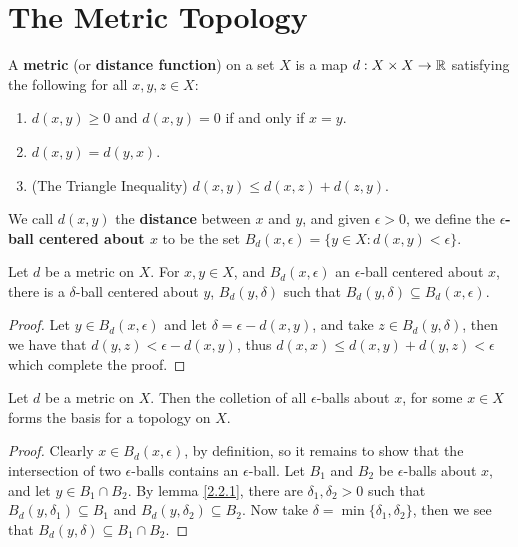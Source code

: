 
\section{The Metric Topology}

\begin{definition}
    A \textbf{metric} (or \textbf{distance function}) on a set $X$ is a map  $d:X \times X
    \rightarrow \mathbb{R}$ satisfying the following for all $x,y,z \in X$:
        \begin{enumerate}[label=(\arabic*)]
            \item $d(x,y) \geq 0$ and $d(x,y)=0$ if and only if $x=y$.

            \item $d(x,y)=d(y,x)$.

            \item (The Triangle Inequality) $d(x,y) \leq d(x,z)+d(z,y)$.
        \end{enumerate}
        We call $d(x,y)$ the \textbf{distance} between $x$ and  $y$, and given  $\epsilon>0$, we
    define the  \textbf{$\epsilon$-ball centered about $x$} to be the set $B_d(x,\epsilon)=\{y \in
    X: d(x,y)<\epsilon\}$.
\end{definition}

\begin{lemma}\label{2.2.1}
    Let $d$ be a metric on  $X$. For  $x,y \in X$, and  $B_d(x,\epsilon)$ an $\epsilon$-ball
    centered about  $x$, there is a  $\delta$-ball centered about  $y$,  $B_d(y,\delta)$ such that
    $B_d(y,\delta) \subseteq B_d(x,\epsilon)$.
\end{lemma}
\begin{proof}
    Let $y \in B_d(x,\epsilon)$ and let $\delta=\epsilon-d(x,y)$, and take $z \in B_d(y,\delta)$,
    then we have that $d(y,z)<\epsilon-d(x,y)$, thus $d(x,x) \leq d (x,y)+d(y,z)<\epsilon$ which
    complete the proof.
\end{proof}

\begin{theorem}\label{2.2.2}
    Let $d$ be a metric on  $X$. Then the colletion of all  $\epsilon$-balls about  $x$, for some
    $x \in X$ forms the basis for a topology on  $X$.
\end{theorem}
\begin{proof}
    Clearly $x \in B_d(x,\epsilon)$, by definition, so it remains to show that the intersection of
    two $\epsilon$-balls contains an  $\epsilon$-ball. Let  $B_1$ and $B_2$ be $\epsilon$-balls
    about  $x$, and let  $y \in B_1 \cap B_2$. By lemma \ref{2.2.1}, there are $\delta_1,\delta_2>0$
    such that $B_d(y,\delta_1) \subseteq B_1$ and $B_d(y,\delta_2) \subseteq B_2$. Now take
    $\delta=\min\{\delta_1, \delta_2\}$, then we see that $B_d(y,\delta) \subseteq B_1 \cap B_2$.
\end{proof}

